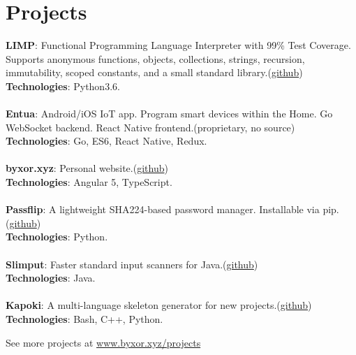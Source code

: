 \documentclass{article}
\newcommand{\yourlight}[1]{\textcolor{gray}{#1}}
\begin{document}
\section{Projects}
\begin{multicols}{2}
\textbf{LIMP}: Functional Programming Language Interpreter with 99\% Test Coverage. Supports anonymous functions, objects, collections, strings, recursion, immutability, scoped constants, and a small standard library.(\href{http://www.github.com/byxor/limp}{github})\\\textbf{Technologies}: Python3.6.\vspace{0.5em}\\\yourlight{\hdashrule{\linewidth}{1pt}{2pt}}\vspace{0.5em}\\\textbf{Entua}: Android/iOS IoT app. Program smart devices within the Home. Go WebSocket backend. React Native frontend.(proprietary, no source)\\\textbf{Technologies}: Go, ES6, React Native, Redux.\vspace{0.5em}\\\yourlight{\hdashrule{\linewidth}{1pt}{2pt}}\vspace{0.5em}\\\textbf{byxor.xyz}: Personal website.(\href{http://www.github.com/byxor/website}{github})\\\textbf{Technologies}: Angular 5, TypeScript.\vspace{0.5em}\\\yourlight{\hdashrule{\linewidth}{1pt}{2pt}}\vspace{0.5em}\\\textbf{Passflip}: A lightweight SHA224-based password manager. Installable via pip.(\href{http://www.github.com/byxor/passflip}{github})\\\textbf{Technologies}: Python.\vspace{0.5em}\\\yourlight{\hdashrule{\linewidth}{1pt}{2pt}}\vspace{0.5em}\\\textbf{Slimput}: Faster standard input scanners for Java.(\href{http://www.github.com/byxor/slimput}{github})\\\textbf{Technologies}: Java.\vspace{0.5em}\\\yourlight{\hdashrule{\linewidth}{1pt}{2pt}}\vspace{0.5em}\\\textbf{Kapoki}: A multi-language skeleton generator for new projects.(\href{http://www.github.com/byxor/kapoki}{github})\\\textbf{Technologies}: Bash, C++, Python.
\end{multicols}
\begin{center}
 See more projects at \url{www.byxor.xyz/projects}
\end{center}
\end{document}
